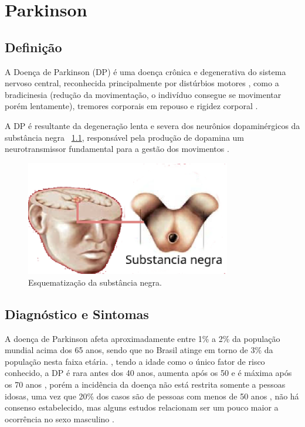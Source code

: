 \chapter{Parkinson}
\section{Definição}

A Doença de Parkinson (DP) é uma doença crônica e degenerativa do sistema nervoso central, reconhecida principalmente por distúrbios motores \cite{souzametodos}, como a bradicinesia (redução da movimentação, o indivíduo consegue se movimentar porém lentamente), tremores corporais em repouso e rigidez corporal \cite{da2016aspectos}.

A DP é resultante da degeneração lenta e severa dos neurônios dopaminérgicos da substância negra ~\ref{substanciaNegra}, responsável pela produção de dopamina um neurotransmissor fundamental para a gestão dos movimentos \cite{eftaxias2015detection}.

\begin{figure}[!htb]
   \centering
    \includegraphics[width=0.8\textwidth]{figuras/substancia_negra.eps}
    \caption{Esquematização da substância negra.}
    \label{substanciaNegra}
\end{figure}

\section{Diagnóstico e Sintomas}
A doença de Parkinson afeta aproximadamente entre 1\% a 2\% da população mundial acima dos 65 anos, sendo que no Brasil atinge em torno de 3\% da população nesta faixa etária. \cite{magalhaes2009descobrindo}, tendo a idade como o único fator de risco conhecido, a DP é rara antes dos 40 anos, aumenta após os 50 e é máxima após os 70 anos \cite{peixinho2006alteraccoes}, porém a incidência da doença não está restrita somente a pessoas idosas, uma vez que 20\% dos casos são de pessoas com menos de 50 anos \cite{gago2014manual}, não há consenso estabelecido, mas alguns estudos relacionam ser um pouco maior a ocorrência no sexo masculino \cite{peixinho2006alteraccoes}.


